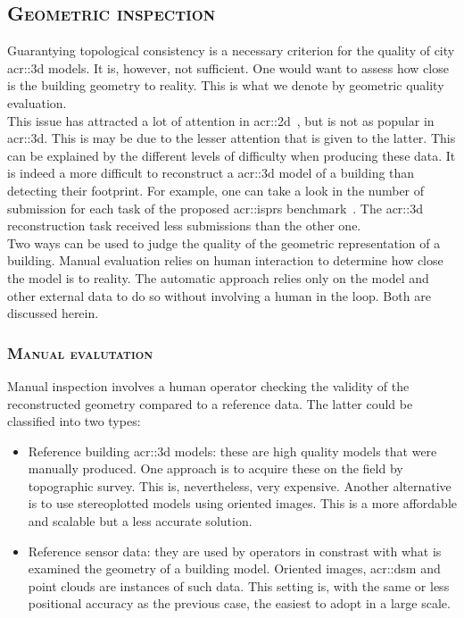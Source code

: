     \subsection{\textsc{Geometric inspection}}
        \label{subsec::introduction::building_model_evaluation::geometric}
        Guarantying topological consistency is a necessary criterion for the quality of city \gls{acr::3d} models.
        It is, however, not sufficient.
        One would want to assess how close is the building geometry to reality.
        This is what we denote by geometric quality evaluation.\\
        This issue has attracted a lot of attention in \gls{acr::2d}~\parencite{mooney2010towards}, but is not as popular in \gls{acr::3d}.
        This is may be due to the lesser attention that is given to the latter.
        This can be explained by the different levels of difficulty when producing these data.
        It is indeed a more difficult to reconstruct a \gls{acr::3d} model of a building than detecting their footprint.
        For example, one can take a look in the number of submission for each task of the proposed \gls{acr::isprs} benchmark~\textcite{rottensteiner2012isprs, rottensteiner2014results}.
        The \gls{acr::3d} reconstruction task received less submissions than the other one.\\
        Two ways can be used to judge the quality of the geometric representation of a building.
        Manual evaluation relies on human interaction to determine how close the model is to reality.
        The automatic approach relies only on the model and other external data to do so without involving a human in the loop.
        Both are discussed herein.

        \subsubsection{\textsc{Manual evalutation}}
            Manual inspection involves a human operator checking the validity of the reconstructed geometry compared to a reference data.
            The latter could be classified into two types:
            \begin{itemize}
                \item Reference building \gls{acr::3d} models: these are high quality models that were manually produced.
                    One approach is to acquire these on the field by topographic survey.
                    This is, nevertheless, very expensive.
                    Another alternative is to use stereoplotted models using oriented images.
                    This is a more affordable and scalable but a less accurate solution.
                \item Reference sensor data: they are used by operators in constrast with what is examined the geometry of a building model.
                    Oriented images, \gls{acr::dsm} and point clouds are instances of such data.
                    This setting is, with the same or less positional accuracy as the previous case, the easiest to adopt in a large scale.
            \end{itemize}

